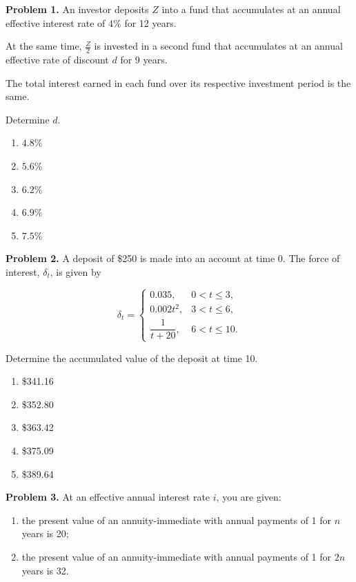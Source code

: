 \documentclass[12pt]{article}
\begin{document}
\newpage

\newpage
\noindent \textbf{Problem 1.}
An investor deposits $Z$ into a fund that accumulates at an annual effective interest rate of $4\%$ for 12 years.

At the same time, $\frac{Z}{2}$ is invested in a second fund that accumulates at an annual effective rate of discount $d$ for 9 years.

The total interest earned in each fund over its respective investment period is the same.

Determine $d$.

\vspace{.5cm}

\begin{enumerate}[label = \Alph*.]
\item $4.8\%$
\item $5.6\%$
\item $6.2\%$
\item $6.9\%$
\item $7.5\%$
\end{enumerate}

\newpage



\noindent \textbf{Problem 2.}
A deposit of \$250 is made into an account at time 0. The force of interest, $\delta_t$, is given by

\[
\delta_t =
\begin{cases}
0.035, & 0 < t \leq 3,\\
0.002t^2, & 3 < t \leq 6,\\
\dfrac{1}{t+20}, & 6 < t \leq 10.
\end{cases}
\]

Determine the accumulated value of the deposit at time 10.

\vspace{.5cm}

\begin{enumerate}[label = \Alph*.]
\item \$341.16
\item \$352.80
\item \$363.42
\item \$375.09
\item \$389.64
\end{enumerate}

\newpage


\noindent \textbf{Problem 3.}
At an effective annual interest rate $i$, you are given:

\begin{enumerate}[label = \roman*.]
\item the present value of an annuity-immediate with annual payments of 1 for $n$ years is 20;
\item the present value of an annuity-immediate with annual payments of 1 for $2n$ years is 32.
\end{enumerate}
\end{document}
